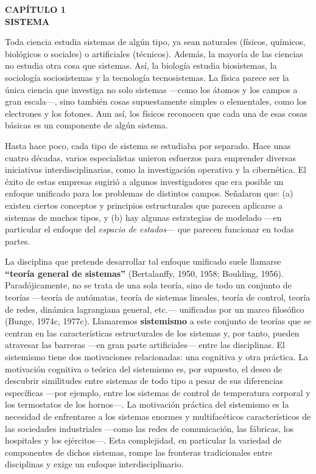 
\begin{center}
{\Large \textbf{CAPÍTULO 1}}\\[0.6cm]
{\LARGE \textbf{SISTEMA}}
\end{center}

\vspace{1cm}


{\fontsize{14}{16}\selectfont
Toda ciencia estudia sistemas de algún tipo, ya sean naturales (físicos, químicos, biológicos o sociales) o artificiales (técnicos). Además, la mayoría de las ciencias no estudia otra cosa que sistemas. Así, la biología estudia biosistemas, la sociología sociosistemas y la tecnología tecnosistemas. La física parece ser la única ciencia que investiga no solo sistemas —como los átomos y los campos a gran escala—, sino también cosas supuestamente simples o elementales, como los electrones y los fotones. Aun así, los físicos reconocen que cada una de esas cosas básicas es un componente de algún sistema.

Hasta hace poco, cada tipo de sistema se estudiaba por separado. Hace unas cuatro décadas, varios especialistas unieron esfuerzos para emprender diversas iniciativas interdisciplinarias, como la investigación operativa y la cibernética.  
El éxito de estas empresas sugirió a algunos investigadores que era posible un enfoque unificado para los problemas de distintos campos. Señalaron que:  
(a) existen ciertos conceptos y principios estructurales que parecen aplicarse a sistemas de muchos tipos, y  
(b) hay algunas estrategias de modelado —en particular el enfoque del \textit{espacio de estados}— que parecen funcionar en todas partes.

La disciplina que pretende desarrollar tal enfoque unificado suele llamarse \textbf{“teoría general de sistemas”} (Bertalanffy, 1950, 1958; Boulding, 1956). Paradójicamente, no se trata de una sola teoría, sino de todo un conjunto de teorías —teoría de autómatas, teoría de sistemas lineales, teoría de control, teoría de redes, dinámica lagrangiana general, etc.— unificadas por un marco filosófico (Bunge, 1974c, 1977c). Llamaremos \textbf{sistemismo} a este conjunto de teorías que se centran en las características estructurales de los sistemas y, por tanto, pueden atravesar las barreras —en gran parte artificiales— entre las disciplinas.
El sistemismo tiene dos motivaciones relacionadas: una cognitiva y otra práctica.  
La motivación cognitiva o teórica del sistemismo es, por supuesto, el deseo de descubrir similitudes entre sistemas de todo tipo a pesar de sus diferencias específicas —por ejemplo, entre los sistemas de control de temperatura corporal y los termostatos de los hornos—.  
La motivación práctica del sistemismo es la necesidad de enfrentarse a los sistemas enormes y multifacéticos característicos de las sociedades industriales —como las redes de comunicación, las fábricas, los hospitales y los ejércitos—. Esta complejidad, en particular la variedad de componentes de dichos sistemas, rompe las fronteras tradicionales entre disciplinas y exige un enfoque interdisciplinario.
}

